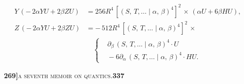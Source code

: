 \documentclass[11pt]{article}
\newcommand{\Cdel}{\mid}
\begin{document}
\[\begin{aligned}
   Y\,(-\,2\alpha Y U + 2\beta Z U) &= 256 R^4\,[(S,\,T,\ldots\Cdel\alpha,\,\beta)^4]^2\,\times\,(\alpha U + 6\beta H U),\\
   Z\,(-\,2\alpha Y U + 2\beta Z U) &= -\,512 R^4\,[(S,\,T,\ldots\Cdel\alpha,\,\beta)^4]^2\,\times\\
                                    &\quad\left\{\begin{aligned}&\partial_\beta\,(S,\,T,\ldots\Cdel\alpha,\,\beta)^4\cdot U\\ &{} - 6\partial_\alpha\,(S,\,T,\ldots\Cdel\alpha,\,\beta)^4\cdot H U.\end{aligned}\right.
\end{aligned}
\]

\newpage
\setcounter{page}{337}

\noindent\textbf{269]}\hfill\textsc{a seventh memoir on quantics.}\hfill\textbf{337}
\end{document}
